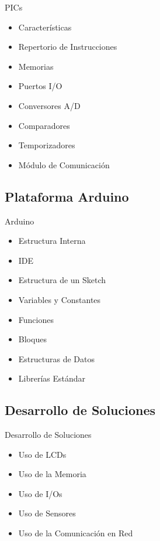 \documentclass[handout,xcolor=dvipsnames]{beamer}
\begin{document}
\begin{frame}{PICs}
\begin{block}{}
\begin{itemize}
 \item Características
 \item Repertorio de Instrucciones
 \item Memorias
 \item Puertos I/O
 \item Conversores A/D
 \item Comparadores
 \item Temporizadores
 \item Módulo de Comunicación
\end{itemize}
\end{block}
\end{frame}

\subsection[Arduino]{Plataforma Arduino}

\begin{frame}{Arduino}
\begin{block}{}
\begin{itemize}
 \item Estructura Interna
 \item IDE
 \item Estructura de un Sketch
 \item Variables y Constantes
 \item Funciones
 \item Bloques
 \item Estructuras de Datos
 \item Librerías Estándar
\end{itemize}
\end{block}
\end{frame}

\subsection[Desarrollo]{Desarrollo de Soluciones}

\begin{frame}{Desarrollo de Soluciones}
\begin{block}{}
\begin{itemize}
 \item Uso de LCDs
 \item Uso de la Memoria
 \item Uso de I/Os
 \item Uso de Sensores
 \item Uso de la Comunicación en Red
\end{itemize}
\end{block}
\end{frame}
\end{document}
